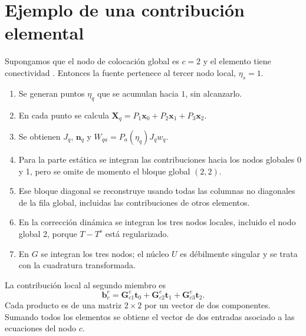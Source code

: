 \documentclass[11pt,a4paper]{report}
\numberwithin{equation}{chapter}
\newcommand{\vect}[1]{\bm{#1}}
\DeclareRobustCommand{\code}[1]{\texttt{\detokenize{#1}}}
\begin{document}
\chapter{Ejemplo de una contribuci\'on elemental}
Supongamos que el nodo de colocaci\'on global es $c=2$ y el elemento
tiene conectividad \code{[0,1,2]}. Entonces la fuente pertenece al
tercer nodo local, $\eta_s=1$.

\begin{enumerate}
 \item Se generan puntos $\eta_q$ que se acumulan hacia $1$, sin alcanzarlo.
 \item En cada punto se calcula
 $\vect X_q=P_1\vect x_0+P_2\vect x_1+P_3\vect x_2$.
 \item Se obtienen $J_q$, $\vect n_q$ y
 $W_{qa}=P_a(\eta_q)J_qw_q$.
 \item Para la parte est\'atica se integran las contribuciones hacia
 los nodos globales 0 y 1, pero se omite de momento el bloque global $(2,2)$.
 \item Ese bloque diagonal se reconstruye usando todas las columnas no
 diagonales de la fila global, incluidas las contribuciones de otros elementos.
 \item En la correcci\'on din\'amica se integran los tres nodos locales,
 incluido el nodo global 2, porque $T-T^s$ est\'a regularizado.
 \item En $G$ se integran los tres nodos; el n\'ucleo $U$ es
 d\'ebilmente singular y se trata con la cuadratura transformada.
\end{enumerate}
La contribuci\'on local al segundo miembro es
\begin{equation}
 \vect b_c^e=
 \vect G^e_{c1}\vect t_0+
 \vect G^e_{c2}\vect t_1+
 \vect G^e_{c3}\vect t_2.
\end{equation}
Cada producto es de una matriz $2\times2$ por un vector de dos componentes.
Sumando todos los elementos se obtiene el vector de dos entradas
asociado a las ecuaciones del nodo $c$.
\end{document}
